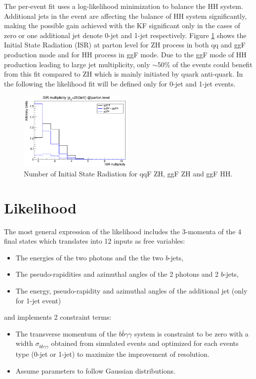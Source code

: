 The per-event fit uses a log-likelihood minimization to balance the HH system. Additional jets in the event are affecting the balance of HH system significantly, making the possible gain achieved with the KF significant only in the cases of zero or one additional jet denote 0-jet and 1-jet respectively. Figure \ref{fig:Adx4:ISR} shows the Initial State Radiation (ISR) at parton level for ZH process in both qq and ggF production mode and for HH process in ggF mode. Due to the ggF mode of HH production leading to large jet multiplicity, only $\sim$50\% of the events could benefit from this fit compared to ZH which is mainly initiated by quark anti-quark. In the following the likelihood fit will be defined only for 0-jet and 1-jet events.  
\begin{figure}[htbp]
    \centering
    \includegraphics[width=0.5\textwidth]{Adx/Adx4/Img/isr.png}
    \begin{tcolorbox}[colback=black!5!white,colframe=white!75!black]
    \caption{Number of Initial State Radiation for qqF ZH, ggF ZH and ggF HH.}
    \label{fig:Adx4:ISR}
    \end{tcolorbox}
    
\end{figure}

\section{Likelihood}

The most general expression of the likelihood includes the 3-momenta of the 4 final states which translates into 12 inputs as free variables:
\begin{itemize}
    \item The energies of the two photons and the the two $b$-jets,
    \item The pseudo-rapidities and azimuthal angles of the 2 photons and 2 $b$-jets,
    \item The energy, pseudo-rapidity and azimuthal angles of the additional jet (only for 1-jet event)
\end{itemize}
and implements 2 constraint terms:
\begin{itemize}
    \item The transverse momentum of the $b\bar{b}\gamma\gamma$ system is constraint to be zero with a width $\sigma_{b\bar{b}\gamma\gamma}$ obtained from simulated \HHyybb events and optimized for each events type (0-jet or 1-jet) to maximize the improvement of \mbb resolution.
    \item Assume parameters to follow Gaussian distributions.
\end{itemize}

